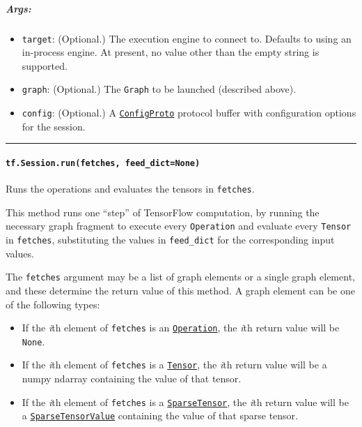 \subparagraph{Args: }\label{args}

\begin{itemize}
\tightlist
\item
  \texttt{target}: (Optional.) The execution engine to connect to.
  Defaults to using an in-process engine. At present, no value other
  than the empty string is supported.
\item
  \texttt{graph}: (Optional.) The \texttt{Graph} to be launched
  (described above).
\item
  \texttt{config}: (Optional.) A
  \href{https://tensorflow.googlesource.com/tensorflow/+/master/tensorflow/core/framework/config.proto}{\texttt{ConfigProto}}
  protocol buffer with configuration options for the session.
\end{itemize}

\begin{center}\rule{0.5\linewidth}{\linethickness}\end{center}

\paragraph{\texorpdfstring{\texttt{tf.Session.run(fetches,\ feed\_dict=None)}
}{tf.Session.run(fetches, feed\_dict=None) }}\label{tf.session.runfetches-feedux5fdictnone}

Runs the operations and evaluates the tensors in \texttt{fetches}.

This method runs one ``step'' of TensorFlow computation, by running the
necessary graph fragment to execute every \texttt{Operation} and
evaluate every \texttt{Tensor} in \texttt{fetches}, substituting the
values in \texttt{feed\_dict} for the corresponding input values.

The \texttt{fetches} argument may be a list of graph elements or a
single graph element, and these determine the return value of this
method. A graph element can be one of the following types:

\begin{itemize}
\tightlist
\item
  If the \emph{i}th element of \texttt{fetches} is an
  \href{../../api_docs/python/framework.md\#Operation}{\texttt{Operation}},
  the \emph{i}th return value will be \texttt{None}.
\item
  If the \emph{i}th element of \texttt{fetches} is a
  \href{../../api_docs/python/framework.md\#Tensor}{\texttt{Tensor}},
  the \emph{i}th return value will be a numpy ndarray containing the
  value of that tensor.
\item
  If the \emph{i}th element of \texttt{fetches} is a
  \href{../../api_docs/python/sparse_ops.md\#SparseTensor}{\texttt{SparseTensor}},
  the \emph{i}th return value will be a
  \href{../../api_docs/python/sparse_ops.md\#SparseTensorValue}{\texttt{SparseTensorValue}}
  containing the value of that sparse tensor.
\end{itemize}


